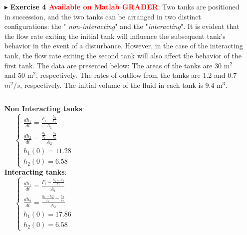 \documentclass[xcolor={dvipsnames,rgb}, aspectratio=169]{beamer}
\begin{document}
\begin{frame}{}
   \begin{itemize}
      \item[$\blacktriangleright$] \textbf{Exercise 4 \textcolor{red}{Available on Matlab
         GRADER}}: \footnotesize{Two tanks are positioned in succession, and the two
         tanks can be arranged in two distinct configurations: the "{\it
         non-interacting}" and the "{\it interacting}". It is evident that the flow rate
         exiting the initial tank will influence the subsequent tank's behavior in the
         event of a disturbance. However, in the case of the interacting tank, the flow
         rate exiting the second tank will also affect the behavior of the first tank.
         The data are presented below: The areas of the tanks are 30 m$^2$ and 50 m$^2$,
         respectively. The rates of outflow from the tanks are 1.2 and 0.7 $m^2 /s$,
         respectively. The initial volume of the fluid in each tank is 9.4 m$^3$.}
         \begin{columns}
            \centering
            \textbf{Non Interacting tanks}:
               \begin{equation*}
                  \begin{cases}
                     \frac{dh_{1}}{dt} = \frac{F_{i} - \frac{h_{1}}{r_{1}}}{A_{1}} \\
                     \frac{dh_{2}}{dt} = \frac{\frac{h_{1}}{r_{1}} - \frac{h_{2}}{r_{2}}}{A_{2}} \\
                     h_{1}(0) = 11.28 \\
                     h_{2}(0) = 6.58
                  \end{cases}
               \end{equation*}
            \centering
            \textbf{Interacting tanks}:
            \begin{equation*}
               \begin{cases}
                  \frac{dh_{1}}{dt} = \frac{F_{i} - \frac{h_{1} - h_{2}}{r_{1}}}{A_{1}} \\
                  \frac{dh_{2}}{dt} = \frac{\frac{h_{1}-h{2}}{r_{1}} - \frac{h_{2}}{r_{2}}}{A_{2}} \\
                  h_{1}(0) = 17.86 \\
                  h_{2}(0) = 6.58
               \end{cases}
            \end{equation*}
         \end{columns}
   \end{itemize}
\end{frame}
\end{document}
